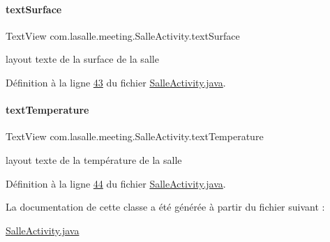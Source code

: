 \mbox{\label{classcom_1_1lasalle_1_1meeting_1_1_salle_activity_a0fb3dcfded70ba78d8ce46a507ff7ef2}} 
\paragraph{\texorpdfstring{text\+Surface}{textSurface}}
{\footnotesize\ttfamily Text\+View com.\+lasalle.\+meeting.\+Salle\+Activity.\+text\+Surface\hspace{0.3cm}{\ttfamily [private]}}



layout texte de la surface de la salle 



Définition à la ligne \hyperlink{_salle_activity_8java_source_l00043}{43} du fichier \hyperlink{_salle_activity_8java_source}{Salle\+Activity.\+java}.

\mbox{\label{classcom_1_1lasalle_1_1meeting_1_1_salle_activity_a234ef25278aeb3164d379158fc294283}} 
\paragraph{\texorpdfstring{text\+Temperature}{textTemperature}}
{\footnotesize\ttfamily Text\+View com.\+lasalle.\+meeting.\+Salle\+Activity.\+text\+Temperature\hspace{0.3cm}{\ttfamily [private]}}



layout texte de la température de la salle 



Définition à la ligne \hyperlink{_salle_activity_8java_source_l00044}{44} du fichier \hyperlink{_salle_activity_8java_source}{Salle\+Activity.\+java}.



La documentation de cette classe a été générée à partir du fichier suivant \+:\begin{DoxyCompactItemize}
\item 
\hyperlink{_salle_activity_8java}{Salle\+Activity.\+java}\end{DoxyCompactItemize}
